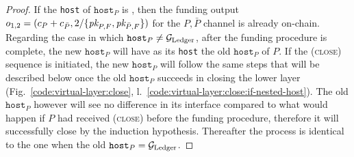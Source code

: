 \begin{proof}
  If the \texttt{host} of $\texttt{host}_P$ is \ledger, then the funding output
  $o_{1, 2} = (c_P + c_{\bar{P}}, 2/\{\textit{pk}_{P, F}, \textit{pk}_{\bar{P}, F}\})$ for the
  $P, \bar{P}$ channel is already on-chain. Regarding the case in which
  $\texttt{host}_P \neq \mathcal{G}_{\mathrm{Ledger}}$, after the funding procedure is complete, the
  new $\texttt{host}_P$ will have as its \texttt{host} the old $\texttt{host}_P$
  of $P$. If the (\textsc{close}) sequence is initiated, the new
  $\texttt{host}_P$ will follow the same steps that will be described below once
  the old $\texttt{host}_P$ succeeds in closing the lower layer
  (Fig.~\ref{code:virtual-layer:close},
  l.~\ref{code:virtual-layer:close:if-nested-host}). The old $\texttt{host}_P$
  however will see no difference in its interface compared to what would happen
  if $P$ had received (\textsc{close}) before the funding procedure, therefore
  it will successfully close by the induction hypothesis. Thereafter the process
  is identical to the one when the old $\texttt{host}_P = \mathcal{G}_{\mathrm{Ledger}}$.


\end{proof}
